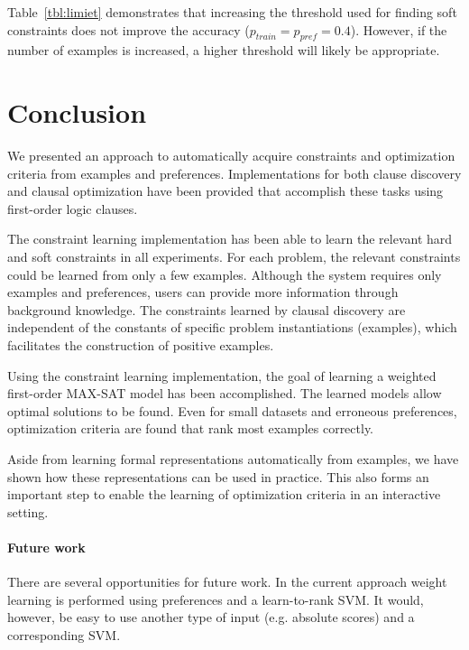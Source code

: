 \documentclass[letterpaper]{article}
\theoremstyle{definition}
\begin{document}
Table~\ref{tbl:limiet} demonstrates that increasing the threshold used for finding soft constraints does not improve the accuracy ($p_{train} = p_{pref} = 0.4$).
However, if the number of examples is increased, a higher threshold will likely be appropriate.


\section{Conclusion}
We presented an approach to automatically acquire constraints and optimization criteria from examples and preferences.
Implementations for both clause discovery and clausal optimization have been provided that accomplish these tasks using first-order logic clauses.

The constraint learning implementation has been able to learn the relevant hard and soft constraints in all experiments.
For each problem, the relevant constraints could be learned from only a few examples.
Although the system requires only examples and preferences, users can provide more information through background knowledge.
The constraints learned by clausal discovery are independent of the constants of specific problem instantiations (examples), which facilitates the construction of positive examples.

Using the constraint learning implementation, the goal of learning a weighted first-order MAX-SAT model has been accomplished.
The learned models allow optimal solutions to be found.
Even for small datasets and erroneous preferences, optimization criteria are found that rank most examples correctly.

Aside from learning formal representations automatically from examples, we have shown how these representations can be used in practice.
This also forms an important step to enable the learning of optimization criteria in an interactive setting.

\paragraph{Future work}
There are several opportunities for future work.
In the current approach weight learning is performed using preferences and a learn-to-rank SVM.
It would, however, be easy to use another type of input (e.g. absolute scores) and a corresponding SVM.
\end{document}
